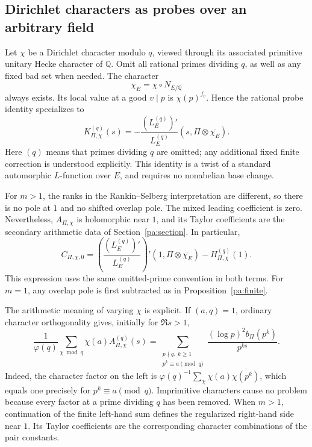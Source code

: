 \documentclass[11pt,reqno]{amsart}
\numberwithin{equation}{section}
\theoremstyle{definition}
\theoremstyle{remark}
\begin{document}
\subsection{Dirichlet characters as probes over an arbitrary field}
Let $\chi$ be a Dirichlet character modulo $q$, viewed through its associated primitive unitary Hecke character of $\mathbb Q$. Omit all rational primes dividing $q$, as well as any fixed bad set when needed. The character
\begin{equation}\chi_E=\chi\circ N_{E/\mathbb Q}\label{pr:normchar}\end{equation}
always exists. Its local value at a good $v\mid p$ is $\chi(p)^{f_v}$. Hence the rational probe identity specializes to
\begin{equation}K_{\Pi,\chi}^{(q)}(s)
=-\frac{(L_E^{(q)})'}{L_E^{(q)}}(s,\Pi\otimes\overline{\chi_E}).\label{pr:charK}\end{equation}
Here $(q)$ means that primes dividing $q$ are omitted; any additional fixed finite correction is understood explicitly. This identity is a twist of a standard automorphic $L$-function over $E$, and requires no nonabelian base change.

For $m>1$, the ranks in the Rankin--Selberg interpretation are different, so there is no pole at $1$ and no shifted overlap pole. The mixed leading coefficient is zero. Nevertheless, $A_{\Pi,\chi}$ is holomorphic near $1$, and its Taylor coefficients are the secondary arithmetic data of Section~\ref{pa:section}. In particular,
\begin{equation}C_{\Pi,\chi,0}
=\left(\frac{(L_E^{(q)})'}{L_E^{(q)}}\right)'(1,\Pi\otimes\overline{\chi_E})
-H_{\Pi,\chi}^{(q)}(1).\label{pr:charC}\end{equation}
This expression uses the same omitted-prime convention in both terms. For $m=1$, any overlap pole is first subtracted as in Proposition~\ref{pa:finite}.

The arithmetic meaning of varying $\chi$ is explicit. If $(a,q)=1$, ordinary character orthogonality gives, initially for $\Re s>1$,
\begin{equation}\frac1{\varphi(q)}\sum_{\chi\bmod q}\chi(a)A_{\Pi,\chi}^{(q)}(s)
=\sum_{\substack{p\nmid q,\ k\ge1\\p^k\equiv a\pmod q}}
\frac{(\log p)^2b_\Pi(p^k)}{p^{ks}}.\label{pr:orthogonality}\end{equation}
Indeed, the character factor on the left is
$\varphi(q)^{-1}\sum_\chi\chi(a)\overline{\chi(p^k)}$, which equals one precisely for $p^k\equiv a\pmod q$. Imprimitive characters cause no problem because every factor at a prime dividing $q$ has been removed. When $m>1$, continuation of the finite left-hand sum defines the regularized right-hand side near $1$. Its Taylor coefficients are the corresponding character combinations of the pair constants.
\end{document}

